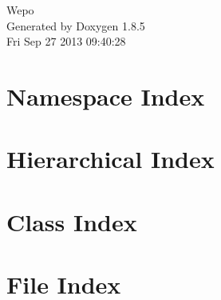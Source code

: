 \documentclass[twoside]{book}
\newcommand{\clearemptydoublepage}{%
  \newpage{\pagestyle{empty}\cleardoublepage}%
}
\begin{document}
\hypersetup{pageanchor=false}
\begin{titlepage}
\vspace*{7cm}
\begin{center}%
{\Large Wepo }\\
\vspace*{1cm}
{\large Generated by Doxygen 1.8.5}\\
\vspace*{0.5cm}
{\small Fri Sep 27 2013 09:40:28}\\
\end{center}
\end{titlepage}
\clearemptydoublepage
\tableofcontents
\clearemptydoublepage
{}
\hypersetup{pageanchor=true}

\chapter{Namespace Index}

\chapter{Hierarchical Index}

\chapter{Class Index}

\chapter{File Index}

\end{document}
